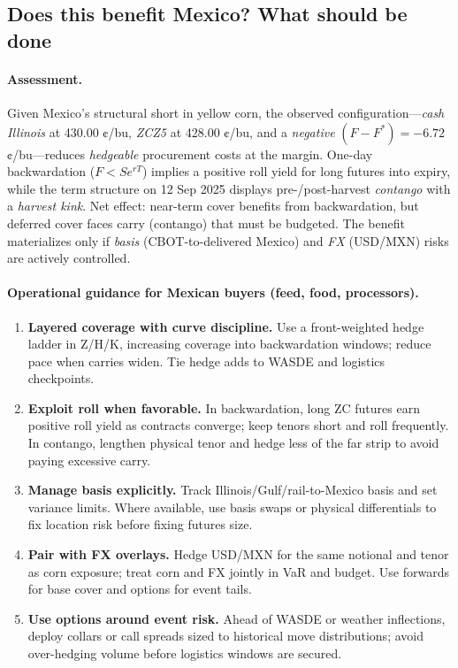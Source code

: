 \documentclass[11pt,a4paper]{article} %
\begin{document}
\subsection{Does this benefit Mexico? What should be done}

\paragraph{Assessment.}
Given Mexico’s structural short in yellow corn, the observed configuration—\emph{cash Illinois} at 430.00 ¢/bu, \emph{ZCZ5} at 428.00 ¢/bu, and a \emph{negative} \((F-F^{*})=-6.72\) ¢/bu—reduces \emph{hedgeable} procurement costs at the margin. One-day backwardation (\(F<S e^{rT}\)) implies a positive roll yield for long futures into expiry, while the term structure on 12 Sep 2025 displays pre-/post-harvest \emph{contango} with a \emph{harvest kink}. Net effect: near-term cover benefits from backwardation, but deferred cover faces carry (contango) that must be budgeted. The benefit materializes only if \emph{basis} (CBOT-to-delivered Mexico) and \emph{FX} (USD/MXN) risks are actively controlled.

\paragraph{Operational guidance for Mexican buyers (feed, food, processors).}
\begin{enumerate}
  \item \textbf{Layered coverage with curve discipline.} Use a front-weighted hedge ladder in Z/H/K, increasing coverage into backwardation windows; reduce pace when carries widen. Tie hedge adds to WASDE and logistics checkpoints.
  \item \textbf{Exploit roll when favorable.} In backwardation, long ZC futures earn positive roll yield as contracts converge; keep tenors short and roll frequently. In contango, lengthen physical tenor and hedge less of the far strip to avoid paying excessive carry.
  \item \textbf{Manage basis explicitly.} Track Illinois/Gulf/rail-to-Mexico basis and set variance limits. Where available, use basis swaps or physical differentials to fix location risk before fixing futures size.
  \item \textbf{Pair with FX overlays.} Hedge USD/MXN for the same notional and tenor as corn exposure; treat corn and FX jointly in VaR and budget. Use forwards for base cover and options for event tails.
  \item \textbf{Use options around event risk.} Ahead of WASDE or weather inflections, deploy collars or call spreads sized to historical move distributions; avoid over-hedging volume before logistics windows are secured.
\end{enumerate}
\end{document}
